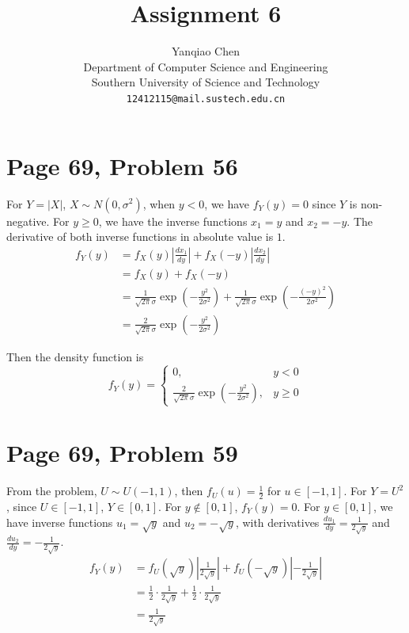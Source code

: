 \documentclass[a4paper, UTF-8]{article}
\theoremstyle{plain}
\begin{document}
\title{Assignment 6}

\author{Yanqiao Chen\\ 
  Department of Computer Science and Engineering\\
  Southern University of Science and Technology\\
  \texttt{12412115@mail.sustech.edu.cn}
  }


\maketitle

\section{Page 69, Problem 56}

For $Y = |X|$, $X \sim N(0, \sigma^2)$, when $y < 0$, we have $f_Y(y) = 0$ since $Y$ is non-negative. For $y \geq 0$, we have the inverse functions $x_1 = y$ and $x_2 = -y$. The derivative of both inverse functions in absolute value is $1$. 
\begin{align*}
f_Y(y) &= f_X(y)\left|\frac{dx_1}{dy}\right| + f_X(-y)\left|\frac{dx_2}{dy}\right| \\
&= f_X(y) + f_X(-y) \\ 
&= \frac{1}{\sqrt{2\pi}\sigma} \exp\left(-\frac{y^2}{2\sigma^2}\right) + \frac{1}{\sqrt{2\pi}\sigma} \exp\left(-\frac{(-y)^2}{2\sigma^2}\right) \\
&= \frac{2}{\sqrt{2\pi}\sigma} \exp\left(-\frac{y^2}{2\sigma^2}\right)
\end{align*}

Then the density function is 
$$
f_Y(y) = \begin{cases}
0, & y < 0 \\
\frac{2}{\sqrt{2\pi}\sigma} \exp\left(-\frac{y^2}{2\sigma^2}\right), & y \geq 0
\end{cases}
$$

\section{Page 69, Problem 59}

From the problem, $U \sim U(-1, 1)$, then $f_U(u) = \frac{1}{2}$ for $u \in [-1, 1]$. For $Y = U^2$, since $U \in [-1, 1]$, $Y \in [0, 1]$.
For $y \notin [0, 1]$, $f_Y(y) = 0$. 
For $y \in [0, 1]$, we have inverse functions $u_1 = \sqrt{y}$ and $u_2 = -\sqrt{y}$, with derivatives $\frac{du_1}{dy} = \frac{1}{2\sqrt{y}}$ and $\frac{du_2}{dy} = -\frac{1}{2\sqrt{y}}$.
\begin{align*}
f_Y(y) &= f_U(\sqrt{y})\left|\frac{1}{2\sqrt{y}}\right| + f_U(-\sqrt{y})\left|-\frac{1}{2\sqrt{y}}\right| \\
&= \frac{1}{2} \cdot \frac{1}{2\sqrt{y}} + \frac{1}{2} \cdot \frac{1}{2\sqrt{y}} \\
&= \frac{1}{2\sqrt{y}}
\end{align*}
\end{document}
